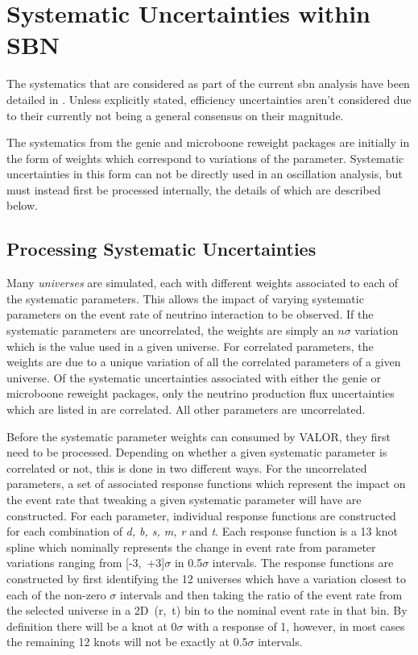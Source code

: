 \newpage
\section{Systematic Uncertainties within SBN}

The systematics that are considered as part of the current \gls{sbn} analysis have been detailed in . Unless explicitly stated, efficiency uncertainties aren't considered due to their currently not being a general consensus on their magnitude. 

The systematics from the \gls{genie} and \gls{microboone} reweight packages are initially in the form of weights which correspond to variations of the parameter. Systematic uncertainties in this form can not be directly used in an oscillation analysis, but must instead first be processed internally, the details of which are described below.

\subsection{Processing Systematic Uncertainties}\label{sec:systematic_validation}

Many \textit{universes} are simulated, each with different weights associated to each of the systematic parameters. This allows the impact of varying systematic parameters on the event rate of neutrino interaction to be observed. If the systematic parameters are uncorrelated, the weights are simply an $n \sigma$ variation which is the value used in a given universe. For correlated parameters, the weights are due to a unique variation of all the correlated parameters of a given universe. Of the systematic uncertainties associated with either the \gls{genie} or \gls{microboone} reweight packages, only the neutrino production flux uncertainties which are listed in  are correlated. All other parameters are uncorrelated. 

Before the systematic parameter weights can consumed by VALOR, they first need to be processed. Depending on whether a given systematic parameter is correlated or not, this is done in two different ways. For the uncorrelated parameters, a set of associated response functions which represent the impact on the event rate that tweaking a given systematic parameter will have are constructed. For each parameter, individual response functions are constructed for each combination of \textit{d, b, s, m, r} and \textit{t}. Each response function is a 13 knot spline which nominally represents the change in event rate from parameter variations ranging from \mbox{[-3, +3]$\sigma$} in 0.5$\sigma$ intervals. The response functions are constructed by first identifying the 12 universes which have a variation closest to each of the non-zero $\sigma$ intervals and then taking the ratio of the event rate from the selected universe in a \mbox{2D (r, t)} bin to the nominal event rate in that bin. By definition there will be a knot at 0$\sigma$ with a response of 1, however, in most cases the remaining 12 knots will not be exactly at 0.5$\sigma$ intervals. 

